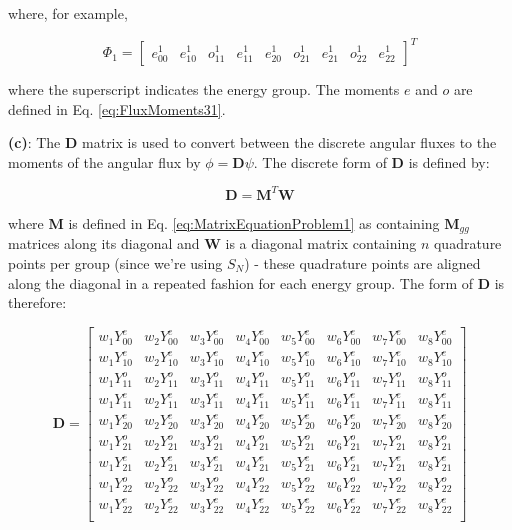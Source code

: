 \documentclass[10pt]{article}
\begin{document}
where, for example,

\begin{equation}
\Phi_1=\begin{bmatrix}
e_{00}^1 & e_{10}^1 & o_{11}^1 & e_{11}^1 & e_{20}^1 & o_{21}^1 & e_{21}^1 & o_{22}^1 & e_{22}^1
\end{bmatrix}^T
\end{equation}

where the superscript indicates the energy group. The moments \(e\) and \(o\) are defined in Eq. \eqref{eq:FluxMoments31}.\newline

\textbf{(c)}: The \textbf{D} matrix is used to convert between the discrete angular fluxes to the moments of the angular flux by \(\phi=\textbf{D}\psi\). The discrete form of \textbf{D} is defined by:

\begin{equation}
\textbf{D}=\textbf{M}^T\textbf{W}
\end{equation}

where \textbf{M} is defined in Eq. \eqref{eq:MatrixEquationProblem1} as containing \(\textbf{M}_{gg}\) matrices along its diagonal and \textbf{W} is a diagonal matrix containing \(n\) quadrature points per group (since we're using \(S_N\)) - these quadrature points are aligned along the diagonal in a repeated fashion for each energy group. The form of \textbf{D} is therefore:

\begin{equation}
\textbf{D}=\begin{bmatrix}
w_1Y_{00}^e & w_2Y_{00}^e & w_3Y_{00}^e & w_4Y_{00}^e & w_5Y_{00}^e & w_6Y_{00}^e & w_7Y_{00}^e & w_8Y_{00}^e\\
w_1Y_{10}^e & w_2Y_{10}^e & w_3Y_{10}^e & w_4Y_{10}^e & w_5Y_{10}^e & w_6Y_{10}^e & w_7Y_{10}^e & w_8Y_{10}^e\\
w_1Y_{11}^o & w_2Y_{11}^o & w_3Y_{11}^o & w_4Y_{11}^o & w_5Y_{11}^o & w_6Y_{11}^o & w_7Y_{11}^o & w_8Y_{11}^o\\
w_1Y_{11}^e & w_2Y_{11}^e & w_3Y_{11}^e & w_4Y_{11}^e & w_5Y_{11}^e & w_6Y_{11}^e & w_7Y_{11}^e & w_8Y_{11}^e\\
w_1Y_{20}^e & w_2Y_{20}^e & w_3Y_{20}^e & w_4Y_{20}^e & w_5Y_{20}^e & w_6Y_{20}^e & w_7Y_{20}^e & w_8Y_{20}^e\\
w_1Y_{21}^o & w_2Y_{21}^o & w_3Y_{21}^o & w_4Y_{21}^o & w_5Y_{21}^o & w_6Y_{21}^o & w_7Y_{21}^o & w_8Y_{21}^o\\
w_1Y_{21}^e & w_2Y_{21}^e & w_3Y_{21}^e & w_4Y_{21}^e & w_5Y_{21}^e & w_6Y_{21}^e & w_7Y_{21}^e & w_8Y_{21}^e\\
w_1Y_{22}^o & w_2Y_{22}^o & w_3Y_{22}^o & w_4Y_{22}^o & w_5Y_{22}^o & w_6Y_{22}^o & w_7Y_{22}^o & w_8Y_{22}^o\\
w_1Y_{22}^e & w_2Y_{22}^e & w_3Y_{22}^e & w_4Y_{22}^e & w_5Y_{22}^e & w_6Y_{22}^e & w_7Y_{22}^e & w_8Y_{22}^e\\
\end{bmatrix}
\end{equation}
\end{document}
